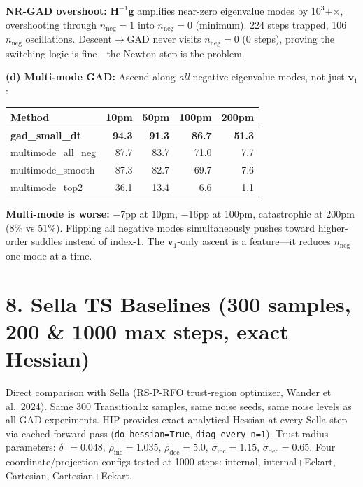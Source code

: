 \documentclass[11pt]{article}
\begin{document}
\textbf{NR-GAD overshoot:} $\mathbf{H}^{-1}\mathbf{g}$ amplifies near-zero eigenvalue modes by $10^3$+$\times$,
overshooting through $n_{\text{neg}}=1$ into $n_{\text{neg}}=0$ (minimum). 224 steps trapped, 106 $n_{\text{neg}}$ oscillations.
Descent$\to$GAD never visits $n_{\text{neg}}=0$ (0 steps), proving the switching logic is fine---the Newton step is the problem.

\textbf{(d) Multi-mode GAD:} Ascend along \textit{all} negative-eigenvalue modes, not just $\mathbf{v}_1$:

\vspace{0.3em}
\begin{tabular}{l*{4}{r}}
\toprule
Method & 10pm & 50pm & 100pm & 200pm \\
\midrule
\textbf{gad\_small\_dt} & \textbf{94.3} & \textbf{91.3} & \textbf{86.7} & \textbf{51.3} \\
multimode\_all\_neg & 87.7 & 83.7 & 71.0 & 7.7 \\
multimode\_smooth & 87.3 & 82.7 & 69.7 & 7.6 \\
multimode\_top2 & 36.1 & 13.4 & 6.6 & 1.1 \\
\bottomrule
\end{tabular}

\textbf{Multi-mode is worse:} $-$7pp at 10pm, $-$16pp at 100pm, catastrophic at 200pm (8\% vs 51\%).
Flipping all negative modes simultaneously pushes toward higher-order saddles instead of index-1.
The $\mathbf{v}_1$-only ascent is a feature---it reduces $n_{\text{neg}}$ one mode at a time.

\section*{8. Sella TS Baselines \small(300 samples, 200 \& 1000 max steps, exact Hessian)}

Direct comparison with Sella (RS-P-RFO trust-region optimizer, Wander et al.\ 2024).
Same 300 Transition1x samples, same noise seeds, same noise levels as all GAD experiments.
HIP provides exact analytical Hessian at every Sella step via cached forward pass (\texttt{do\_hessian=True}, \texttt{diag\_every\_n=1}).
Trust radius parameters: $\delta_0\!=\!0.048$, $\rho_{\text{inc}}\!=\!1.035$, $\rho_{\text{dec}}\!=\!5.0$, $\sigma_{\text{inc}}\!=\!1.15$, $\sigma_{\text{dec}}\!=\!0.65$.
Four coordinate/projection configs tested at 1000 steps: internal, internal+Eckart, Cartesian, Cartesian+Eckart.
\end{document}
